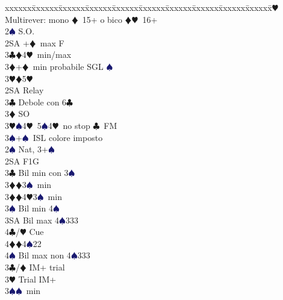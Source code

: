 \documentclass[a4paper,italian]{article}
\newcommand{\BC}{\textcolor{OliveGreen}{$\clubsuit$}}
\newcommand{\BD}{\textcolor{RedOrange}{$\vardiamondsuit$}}
\newcommand{\BH}{\textcolor{Red2}{$\varheartsuit${}}}
\newcommand{\BS}{\textcolor{MidnightBlue}{$\spadesuit${}}}
\newenvironment{bidtable}
{\begin{tabbing}

    xxxxxx\=xxxxxx\=xxxxxx\=xxxxxx\=xxxxxx\=xxxxxx\=xxxxxx\=xxxxxx\=xxxxxx\=xxxxxx\=\kill}
{\end{tabbing} }%
\begin{document}
\begin{multicols}{2}
\begin{bidtable}
                                            2\BH \> Multirever: mono \BD\ 15+ o bico \BD \BH\ 16+\+\\
                                            2\BS \> S.O.\+\\
                                            2SA +\BD\ max F\\
                                            3\BC {}\BD4\BH\ min/max\\
                                            3\BD {}+\BD\ min probabile SGL \BS \\
                                            3\BH {}\BD5\BH\-\\
                                            2SA \> Relay \\
                                            3\BC \> Debole con 6\BC \\
                                            3\BD \> SO\\
                                            3\BH {}\BS 4\BH\ 5\BS 4\BH\ no stop \BC\ FM\\
                                            3\BS {}+\BS\ ISL colore imposto\-\\
                                            2\BS \> Nat, 3+\BS \+\\
                                            2SA \> F1G\+\\
                                            3\BC \> Bil min con 3\BS \\
                                            3\BD {}\BD 3\BS\ min\\
                                            3\BD {}\BD 4\BH 3\BS\ min\\
                                            3\BS \> Bil min 4\BS \\
                                            3SA \> Bil max 4\BS 333\\
                                            4\BC/\BH \> Cue\\
                                            4\BD {}\BD 4\BS 22\\
                                            4\BS \> Bil max non 4\BS 333\-\\
                                            3\BC/\BD \> IM+ trial\\
                                            3\BH \> Trial IM+\+\\
                                            3\BS {}\BS\ min\\

\end{bidtable}
\end{multicols}
\end{document}
